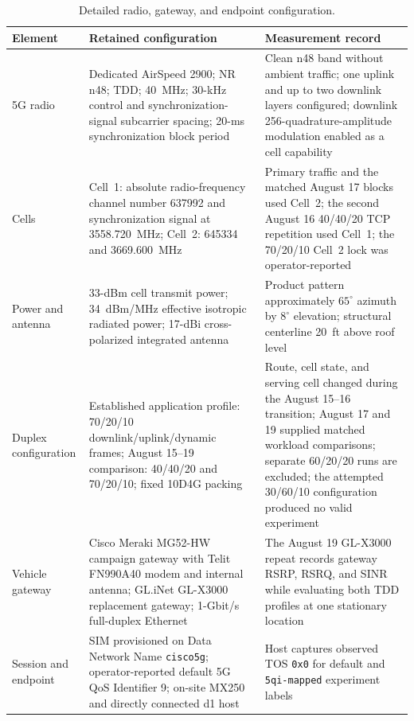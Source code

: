 \begin{table}[t]
  \caption{Detailed radio, gateway, and endpoint configuration.}
  \label{tab:radio-details}
  \centering
  \scriptsize
  \setlength{\tabcolsep}{2.7pt}
  \begin{tabular}{@{}p{}p{}p{}@{}}
    \toprule
    Element & Retained configuration & Measurement record \\
    \midrule
    5G radio & Dedicated AirSpeed 2900; NR n48; TDD; 40~MHz; 30-kHz control and synchronization-signal subcarrier spacing; 20-ms synchronization block period & Clean n48 band without ambient traffic; one uplink and up to two downlink layers configured; downlink 256-quadrature-amplitude modulation enabled as a cell capability \\
    Cells & Cell~1: absolute radio-frequency channel number 637992 and synchronization signal at 3558.720~MHz; Cell~2: 645334 and 3669.600~MHz & Primary traffic and the matched August 17 blocks used Cell~2; the second August 16 40/40/20 TCP repetition used Cell~1; the 70/20/10 Cell~2 lock was operator-reported \\
    Power and antenna & 33-dBm cell transmit power; 34~dBm/MHz effective isotropic radiated power; 17-dBi cross-polarized integrated antenna & Product pattern approximately $65^{\circ}$ azimuth by $8^{\circ}$ elevation; structural centerline 20~ft above roof level \\
    Duplex configuration & Established application profile: 70/20/10 downlink/uplink/dynamic frames; August 15--19 comparison: 40/40/20 and 70/20/10; fixed 10D4G packing & Route, cell state, and serving cell changed during the August 15--16 transition; August 17 and 19 supplied matched workload comparisons; separate 60/20/20 runs are excluded; the attempted 30/60/10 configuration produced no valid experiment \\
    Vehicle gateway & Cisco Meraki MG52-HW campaign gateway with Telit FN990A40 modem and internal antenna; GL.iNet GL-X3000 replacement gateway; 1-Gbit/s full-duplex Ethernet & The August 19 GL-X3000 repeat records gateway RSRP, RSRQ, and SINR while evaluating both TDD profiles at one stationary location \\
    Session and endpoint & SIM provisioned on Data Network Name \texttt{cisco5g}; operator-reported default 5G QoS Identifier 9; on-site MX250 and directly connected d1 host & Host captures observed TOS \texttt{0x0} for default and \texttt{5qi-mapped} experiment labels \\

\end{tabular}
\end{table}

